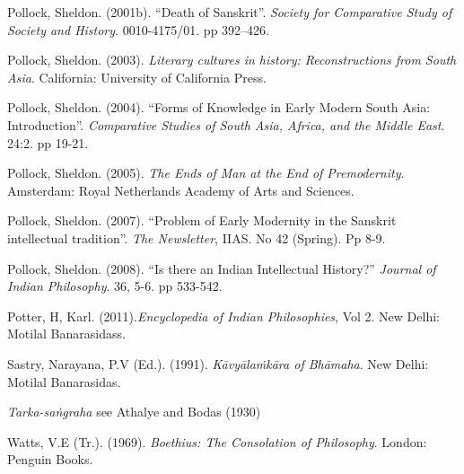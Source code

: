 \begin{thebibliography}{99}
 Pollock, Sheldon. (2001b). “Death of Sanskrit”. {\sl Society for Comparative Study of Society and History}. 0010-4175/01. pp 392–426. 

 Pollock, Sheldon. (2003). {\sl Literary cultures in history: Reconstructions from South Asia}. California: University of California Press. 

 Pollock, Sheldon. (2004). “Forms of Knowledge in Early Modern South Asia: Introduction”. {\sl Comparative Studies of South Asia, Africa, and the Middle East}. 24:2. pp 19-21.

 Pollock, Sheldon. (2005). {\sl The Ends of Man at the End of Premodernity}. Amsterdam: Royal Netherlands Academy of Arts and Sciences. 

 Pollock, Sheldon. (2007). “Problem of Early Modernity in the Sanskrit intellectual tradition”. {\sl The Newsletter}, IIAS. No 42 (Spring). Pp 8-9. 

 Pollock, Sheldon. (2008). “Is there an Indian Intellectual History?” {\sl Journal of Indian Philosophy}. 36, 5-6. pp 533-542.

 Potter, H, Karl. (2011).{\sl  Encyclopedia of Indian Philosophies}, Vol 2. New Delhi: Motilal Banarasidass. 

 Sastry, Narayana, P.V (Ed.). (1991). {\sl Kāvyālaṁkāra of Bhāmaha}. New Delhi: Motilal Banarasidas. 

 {\sl Tarka-saṅgraha} see Athalye and Bodas (1930)

 Watts, V.E (Tr.). (1969). {\sl Boethius: The Consolation of Philosophy}. London: Penguin Books. 
\end{thebibliography}

\theendnotes
